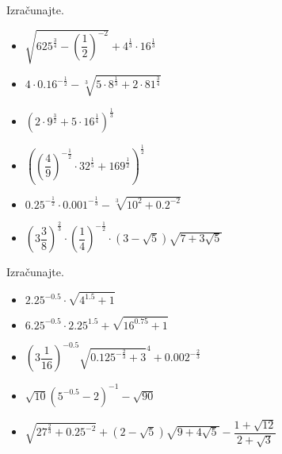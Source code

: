             
            \begin{naloga}
                Izračunajte.
                \begin{multicols}{2}
                    \begin{itemize}
                        \item $\displaystyle \sqrt{625^\frac{3}{4}-\left(\dfrac{1}{2}\right)^{-2}}+4^\frac{1}{3}\cdot 16^\frac{1}{3} $ 
                        \item $\displaystyle 4\cdot 0.16^{-\frac{1}{2}}-\sqrt[3]{5\cdot 8^\frac{1}{3}+2\cdot 81^\frac{3}{4}} $ 
                        \item $\displaystyle \left(2\cdot 9^\frac{3}{2}+5\cdot 16^\frac{1}{4}\right)^\frac{1}{3} $ 
                        \item $\displaystyle \left(\left(\dfrac{4}{9}\right)^{-\frac{1}{2}}\cdot 32^\frac{1}{5}+169^\frac{1}{2}\right)^\frac{1}{2} $ 
                        \item $\displaystyle 0.25^{-\frac{1}{2}}\cdot 0.001^{-\frac{1}{3}} -\sqrt[3]{10^2+0.2^{-2}} $ 
                        \item $\displaystyle \left(3\dfrac{3}{8}\right)^\frac{2}{3}\cdot\left(\dfrac{1}{4}\right)^{-\frac{1}{2}}\cdot\left(3-\sqrt{5}\right)\sqrt{7+3\sqrt{5}} $ 
                    \end{itemize}
                \end{multicols}
            \end{naloga}
        
        
            \begin{naloga}
                Izračunajte.
                \begin{multicols}{2}
                    \begin{itemize}
                        \item $\displaystyle 2.25^{-0.5}\cdot\sqrt{4^{1.5}+1} $ 
                        \item $\displaystyle 6.25^{-0.5}\cdot 2.25^{1.5}+\sqrt{16^{0.75}+1} $ 
                        \item $\displaystyle \left(3\dfrac{1}{16}\right)^{-0.5}\sqrt{0.125^{-\frac{2}{3}}+3}^4+0.002^{-\frac{2}{3}} $ 
                        \item $\displaystyle \sqrt{10}\left(5^{-0.5}-2\right)^{-1}-\sqrt{90} $ 
                        \item $\displaystyle \sqrt{27^\frac{2}{3}+0.25^{-2}}+\left(2-\sqrt{5}\right)\sqrt{9+4\sqrt{5}}-\dfrac{1+\sqrt{12}}{2+\sqrt{3}} $ 
                    \end{itemize}
                \end{multicols}
            \end{naloga}

